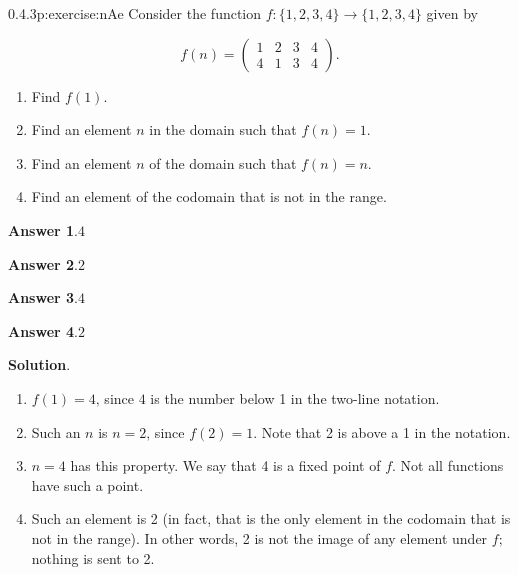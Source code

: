 \documentclass[twoside,11pt,]{book}
\newcommand{\blocktitlefont}{\relax}
\numberwithin{equation}{chapter}
\newcommand{\twoline}[2]{\begin{pmatrix}#1 \\ #2 \end{pmatrix}}
\newcommand{\amp}{&}
\begin{document}
\begin{divisionsolution}{0.4.3}{}{p:exercise:nAe}%
Consider the function \(f:\{1,2,3,4\} \to \{1,2,3,4\}\) given by%
\par
%
\begin{equation*}
f(n) = \twoline{1 \amp 2 \amp 3 \amp 4}{4 \amp 1 \amp 3 \amp 4}
\text{.}
\end{equation*}
%
\par
%
\begin{enumerate}[label=(\alph*)]
\item{}Find \(f(1)\text{.}\)%
\item{}Find an element \(n\) in the domain such that \(f(n) = 1\text{.}\)%
\item{}Find an element \(n\) of the domain such that \(f(n) = n\text{.}\)%
\item{}Find an element of the codomain that is not in the range.%
\end{enumerate}
%
\par\smallskip%
\noindent\textbf{\blocktitlefont Answer 1}.\quad{}\(4\)%
\par\smallskip%
\noindent\textbf{\blocktitlefont Answer 2}.\quad{}\(2\)%
\par\smallskip%
\noindent\textbf{\blocktitlefont Answer 3}.\quad{}\(4\)%
\par\smallskip%
\noindent\textbf{\blocktitlefont Answer 4}.\quad{}\(2\)%
\par\smallskip%
\noindent\textbf{\blocktitlefont Solution}.\quad{}%
\begin{enumerate}[label=(\alph*)]
\item{}\(f(1) = 4\text{,}\) since \(4\) is the number below 1 in the two-line notation.%
\item{}Such an \(n\) is \(n= 2\text{,}\) since \(f(2) = 1\text{.}\) Note that 2 is above a 1 in the notation.%
\item{}\(n = 4\) has this property. We say that 4 is a fixed point of \(f\text{.}\) Not all functions have such a point.%
\item{}Such an element is 2 (in fact, that is the only element in the codomain that is not in the range). In other words, 2 is not the image of any element under \(f\text{;}\) nothing is sent to 2.%
\end{enumerate}
%
\end{divisionsolution}%
\end{document}
